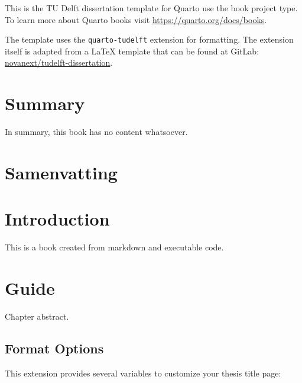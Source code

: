 \documentclass{tudelft}
\begin{document}
This is the TU Delft dissertation template for Quarto use the book
project type. To learn more about Quarto books visit
\url{https://quarto.org/docs/books}.

The template uses the \texttt{quarto-tudelft} extension for formatting.
The extension itself is adapted from a LaTeX template that can be found
at GitLab:
\href{https://gitlab.com/novanext/tudelft-dissertation}{novanext/tudelft-dissertation}.


\chapter*{Summary}\label{summary}


In summary, this book has no content whatsoever.


\chapter*{Samenvatting}\label{samenvatting}


\mainmatter


\chapter{Introduction}\label{introduction}

This is a book created from markdown and executable code.


\chapter{Guide}\label{guide}

Chapter abstract.

\hfill\break

\section{Format Options}\label{format-options}

This extension provides several variables to customize your thesis title
page:
\end{document}
